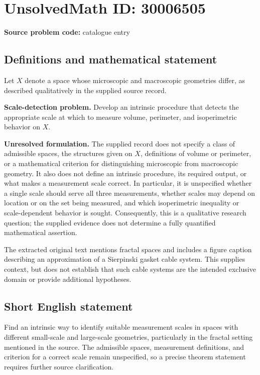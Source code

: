 \documentclass[11pt]{article}
\begin{document}
\section*{UnsolvedMath ID: 30006505}
\textbf{Source problem code:} catalogue entry
\subsection{Definitions and mathematical statement}
Let \(X\) denote a space whose microscopic and macroscopic geometries differ, as described qualitatively in the supplied source record.

\textbf{Scale-detection problem.} Develop an intrinsic procedure that detects the appropriate scale at which to measure volume, perimeter, and isoperimetric behavior on \(X\).

\textbf{Unresolved formulation.} The supplied record does not specify a class of admissible spaces, the structures given on \(X\), definitions of volume or perimeter, or a mathematical criterion for distinguishing microscopic from macroscopic geometry. It also does not define an intrinsic procedure, its required output, or what makes a measurement scale correct. In particular, it is unspecified whether a single scale should serve all three measurements, whether scales may depend on location or on the set being measured, and which isoperimetric inequality or scale-dependent behavior is sought. Consequently, this is a qualitative research question; the supplied evidence does not determine a fully quantified mathematical assertion.

The extracted original text mentions fractal spaces and includes a figure caption describing an approximation of a Sierpinski gasket cable system. This supplies context, but does not establish that such cable systems are the intended exclusive domain or provide additional hypotheses.
\subsection{Short English statement}
Find an intrinsic way to identify suitable measurement scales in spaces with different small-scale and large-scale geometries, particularly in the fractal setting mentioned in the source. The admissible spaces, measurement definitions, and criterion for a correct scale remain unspecified, so a precise theorem statement requires further source clarification.
\end{document}
